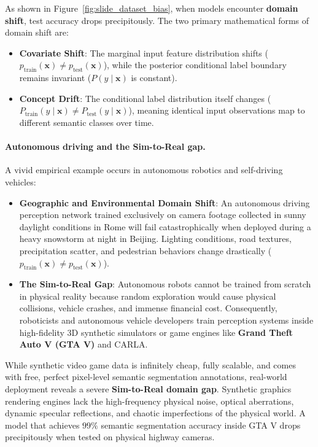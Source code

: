 As shown in Figure~\ref{fig:slide_dataset_bias}, when models encounter \textbf{domain shift}, test accuracy drops precipitously. The two primary mathematical forms of domain shift are:
\begin{itemize}
  \item \textbf{Covariate Shift}: The marginal input feature distribution shifts ($p_{\text{train}}(\mathbf{x}) \ne p_{\text{test}}(\mathbf{x})$), while the posterior conditional label boundary remains invariant ($P(y \mid \mathbf{x})$ is constant).
  \item \textbf{Concept Drift}: The conditional label distribution itself changes ($P_{\text{train}}(y \mid \mathbf{x}) \ne P_{\text{test}}(y \mid \mathbf{x})$), meaning identical input observations map to different semantic classes over time.
\end{itemize}

\paragraph{Autonomous driving and the Sim-to-Real gap.}
A vivid empirical example occurs in autonomous robotics and self-driving vehicles:
\begin{itemize}
  \item \textbf{Geographic and Environmental Domain Shift}: An autonomous driving perception network trained exclusively on camera footage collected in sunny daylight conditions in Rome will fail catastrophically when deployed during a heavy snowstorm at night in Beijing. Lighting conditions, road textures, precipitation scatter, and pedestrian behaviors change drastically ($p_{\text{train}}(\mathbf{x}) \ne p_{\text{test}}(\mathbf{x})$).
  \item \textbf{The Sim-to-Real Gap}: Autonomous robots cannot be trained from scratch in physical reality because random exploration would cause physical collisions, vehicle crashes, and immense financial cost. Consequently, roboticists and autonomous vehicle developers train perception systems inside high-fidelity 3D synthetic simulators or game engines like \textbf{Grand Theft Auto V (GTA V)} and CARLA. 
\end{itemize}
While synthetic video game data is infinitely cheap, fully scalable, and comes with free, perfect pixel-level semantic segmentation annotations, real-world deployment reveals a severe \textbf{Sim-to-Real domain gap}. Synthetic graphics rendering engines lack the high-frequency physical noise, optical aberrations, dynamic specular reflections, and chaotic imperfections of the physical world. A model that achieves $99\%$ semantic segmentation accuracy inside GTA V drops precipitously when tested on physical highway cameras.

